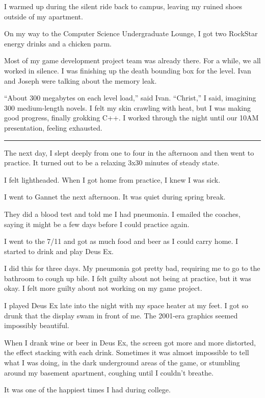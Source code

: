 I warmed up during the silent ride back to campus, leaving my ruined shoes
outside of my apartment.  

On my way to the Computer Science Undergraduate Lounge, I got two RockStar
energy drinks and a chicken parm.

Most of my game development project team was already there.  For a while, we all
worked in silence.  I was finishing up the death bounding box for the level.
Ivan and Joseph were talking about the memory leak.

``About 300 megabytes on each level load,'' said Ivan.  ``Christ,'' I said,
imagining 300 medium-length novels.  I felt my skin crawling with heat, but I
was making good progress, finally grokking C++.  I worked through the night
until our 10AM presentation, feeling exhausted.

\plainfancybreak{12pt}{2}{* * *}

The next day, I slept deeply from one to four in the afternoon and then went to
practice.  It turned out to be a relaxing 3x30 minutes of steady state.  

I felt lightheaded.  When I got home from practice, I knew I was sick.  

I went to Gannet the next afternoon.  It was quiet during spring break.

They did a blood test and told me I had pneumonia.  I emailed the coaches,
saying it might be a few days before I could practice again.

I went to the 7/11 and got as much food and beer as I could carry home.  I
started to drink and play Deus Ex.  

I did this for three days.  My pneumonia got pretty bad, requiring me to go to
the bathroom to cough up bile.  I felt guilty about not being at practice, but
it was okay.  I felt more guilty about not working on my game project. 
 
I played Deus Ex late into the night with my space heater at my feet.  I got so
drunk that the display swam in front of me.  The 2001-era graphics seemed
impossibly beautiful.  

When I drank wine or beer in Deus Ex, the screen got more and more distorted,
the effect stacking with each drink.  Sometimes it was almost impossible to tell
what I was doing, in the dark underground areas of the game, or stumbling around
my basement apartment, coughing until I couldn't breathe.

It was one of the happiest times I had during college.

